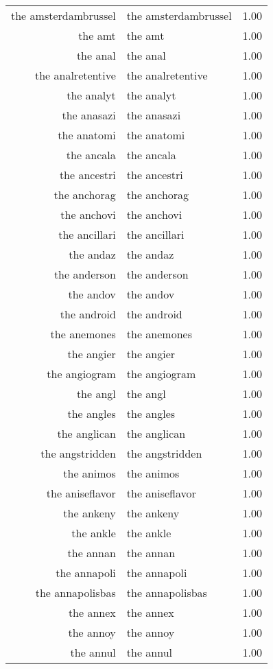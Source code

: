 \begin{table}[ht]
\begin{tabular}{rlr}
  the amsterdambrussel & the amsterdambrussel & 1.00 \\ 
  the amt & the amt & 1.00 \\ 
  the anal & the anal & 1.00 \\ 
  the analretentive & the analretentive & 1.00 \\ 
  the analyt & the analyt & 1.00 \\ 
  the anasazi & the anasazi & 1.00 \\ 
  the anatomi & the anatomi & 1.00 \\ 
  the ancala & the ancala & 1.00 \\ 
  the ancestri & the ancestri & 1.00 \\ 
  the anchorag & the anchorag & 1.00 \\ 
  the anchovi & the anchovi & 1.00 \\ 
  the ancillari & the ancillari & 1.00 \\ 
  the andaz & the andaz & 1.00 \\ 
  the anderson & the anderson & 1.00 \\ 
  the andov & the andov & 1.00 \\ 
  the android & the android & 1.00 \\ 
  the anemones & the anemones & 1.00 \\ 
  the angier & the angier & 1.00 \\ 
  the angiogram & the angiogram & 1.00 \\ 
  the angl & the angl & 1.00 \\ 
  the angles & the angles & 1.00 \\ 
  the anglican & the anglican & 1.00 \\ 
  the angstridden & the angstridden & 1.00 \\ 
  the animos & the animos & 1.00 \\ 
  the aniseflavor & the aniseflavor & 1.00 \\ 
  the ankeny & the ankeny & 1.00 \\ 
  the ankle & the ankle & 1.00 \\ 
  the annan & the annan & 1.00 \\ 
  the annapoli & the annapoli & 1.00 \\ 
  the annapolisbas & the annapolisbas & 1.00 \\ 
  the annex & the annex & 1.00 \\ 
  the annoy & the annoy & 1.00 \\ 
  the annul & the annul & 1.00 \\ 

\end{tabular}
\end{table}
